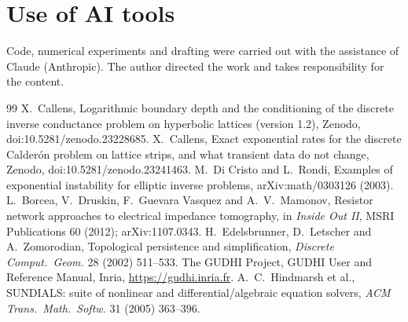 \documentclass[11pt,a4paper]{article}
\begin{document}
\section*{Use of AI tools}
Code, numerical experiments and drafting were carried out with the assistance of Claude (Anthropic). The author directed the work and takes responsibility for the content.

\begin{thebibliography}{99}
 X.~Callens, Logarithmic boundary depth and the conditioning of the discrete inverse conductance problem on hyperbolic lattices (version 1.2), Zenodo, doi:10.5281/zenodo.23228685.
 X.~Callens, Exact exponential rates for the discrete Calder\'on problem on lattice strips, and what transient data do not change, Zenodo, doi:10.5281/zenodo.23241463.
 M.~Di Cristo and L.~Rondi, Examples of exponential instability for elliptic inverse problems, arXiv:math/0303126 (2003).
 L.~Borcea, V.~Druskin, F.~Guevara Vasquez and A.~V.~Mamonov, Resistor network approaches to electrical impedance tomography, in \emph{Inside Out II}, MSRI Publications 60 (2012); arXiv:1107.0343.
 H.~Edelsbrunner, D.~Letscher and A.~Zomorodian, Topological persistence and simplification, \emph{Discrete Comput.\ Geom.} 28 (2002) 511--533.
 The GUDHI Project, GUDHI User and Reference Manual, Inria, \url{https://gudhi.inria.fr}.
 A.~C.~Hindmarsh et al., SUNDIALS: suite of nonlinear and differential/algebraic equation solvers, \emph{ACM Trans.\ Math.\ Softw.} 31 (2005) 363--396.
\end{thebibliography}
\end{document}
